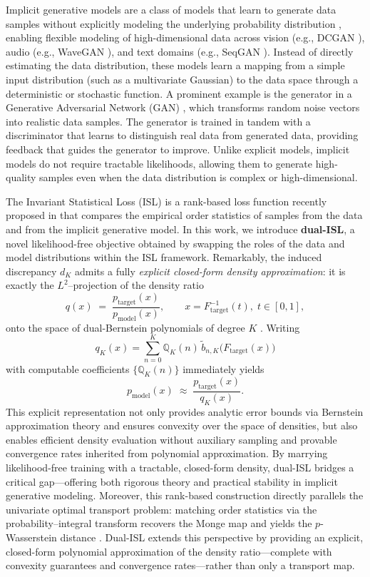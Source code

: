 \documentclass{article}
\begin{document}
Implicit generative models are a class of models that learn to generate data samples without explicitly modeling the underlying probability distribution \cite{mohamed2016learning}, enabling flexible modeling of high-dimensional data across vision (e.g., DCGAN \cite{radford2015unsupervised}), audio (e.g., WaveGAN \cite{donahue2018adversarial}), and text domains (e.g., SeqGAN \cite{yu2017sequence}). Instead of directly estimating the data distribution, these models learn a mapping from a simple input distribution (such as a multivariate Gaussian) to the data space through a deterministic or stochastic function. A prominent example is the generator in a Generative Adversarial Network (GAN) \cite{goodfellow2014generative}, which transforms random noise vectors into realistic data samples. The generator is trained in tandem with a discriminator that learns to distinguish real data from generated data, providing feedback that guides the generator to improve. Unlike explicit models, implicit models do not require tractable likelihoods, allowing them to generate high-quality samples even when the data distribution is complex or high-dimensional.

The Invariant Statistical Loss (ISL) is a rank-based loss function recently proposed in \cite{de2024training} that compares the empirical order statistics of samples from the data and from the implicit generative model. In this work, we introduce \textbf{dual-ISL}, a novel likelihood-free objective obtained by swapping the roles of the data and model distributions within the ISL framework. Remarkably, the induced discrepancy \(d_K\) admits a fully \emph{explicit closed-form density approximation}: it is exactly the \(L^2\)–projection of the density ratio
\[
q(x)\;=\;\frac{p_{\mathrm{target}}(x)}{p_{\mathrm{model}}(x)}, 
\qquad
x = F_{\mathrm{target}}^{-1}(t),\;t\in[0,1],
\]
onto the space of dual-Bernstein polynomials of degree \(K\) \cite{lorentz2012bernstein,jiittler1998dual}. Writing
\[
q_K(x)
=\sum_{n=0}^K \mathbb{Q}_K(n)\,\tilde b_{n,K}\bigl(F_{\mathrm{target}}(x)\bigr)
\]
with computable coefficients \(\{\mathbb{Q}_K(n)\}\) immediately yields
\[
p_{\mathrm{model}}(x)\;\approx\;\frac{p_{\mathrm{target}}(x)}{q_K(x)}.
\]
This explicit representation not only provides analytic error bounds via Bernstein approximation theory and ensures convexity over the space of densities, but also enables efficient density evaluation without auxiliary sampling and provable convergence rates inherited from polynomial approximation. By marrying likelihood-free training with a tractable, closed-form density, dual-ISL bridges a critical gap—offering both rigorous theory and practical stability in implicit generative modeling. Moreover, this rank-based construction directly parallels the univariate optimal transport problem: matching order statistics via the probability–integral transform recovers the Monge map and yields the \(p\)-Wasserstein distance \cite{villani2008optimal}. Dual-ISL extends this perspective by providing an explicit, closed-form polynomial approximation of the density ratio—complete with convexity guarantees and convergence rates—rather than only a transport map.
\end{document}
